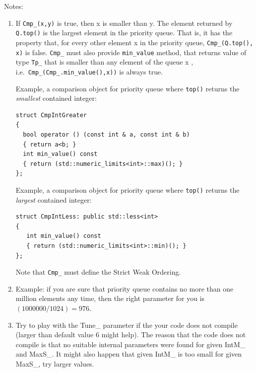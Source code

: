 \documentclass[twoside]{book}
\begin{document}
Notes:
\begin{enumerate}
\item If \texttt{Cmp\_(x,y)} is true, then x is smaller than y. The element
returned by \texttt{Q.top()} is the largest element in the priority queue. That
is, it has the property that, for every other element x in the
priority queue, \texttt{Cmp\_(Q.top(), x)} is false. \texttt{Cmp\_}
must also provide 
\texttt{min\_value} method, that returns value of type \texttt{Tp\_}
that is smaller than 
any element of the queue x , i.e.\ \texttt{Cmp\_(Cmp\_.min\_value(),x))}
is always true. 

Example, a comparison object for priority queue where \texttt{top()}
returns the \emph{smallest} contained integer: 
\begin{lstlisting}
struct CmpIntGreater
{
  bool operator () (const int & a, const int & b)
  { return a<b; }
  int min_value() const  
  { return (std::numeric_limits<int>::max)(); }
};
\end{lstlisting}
Example, a comparison object for priority queue where \texttt{top()}
returns the \emph{largest} contained integer: 
\begin{lstlisting}
struct CmpIntLess: public std::less<int>
{
   int min_value() const  
   { return (std::numeric_limits<int>::min)(); }
};
\end{lstlisting}
Note that \texttt{Cmp\_} must define the Strict Weak Ordering.

\item Example: if you are sure that priority queue contains no more
than one million elements any time, then the right parameter for you is
$(1000000/1024)= 976$.

\item Try to play with the Tune\_ parameter if the your code does not
compile (larger than default value 6 might help). The reason that the
code does not 
compile is that no suitable 
internal parameters were found for given IntM\_ and MaxS\_. It might
also happen that given IntM\_ is too small for given MaxS\_, try larger
values.
 

\end{enumerate}
\end{document}
